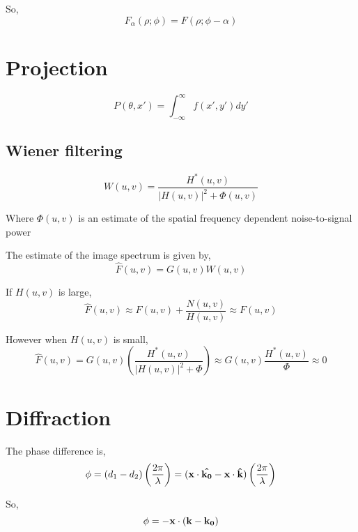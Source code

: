 \documentclass[12pt]{article}
\begin{document}
So,
\begin{equation}
    F_\alpha (\rho;\phi) = F(\rho;\phi-\alpha)
\end{equation}

\section{Projection}

\begin{equation}
    P(\theta,x') = \int_{-\infty}^\infty f(x',y')dy'
\end{equation}

\subsection{Wiener filtering}
\begin{equation}
    W(u,v) = \frac{H^*(u,v)}{ |H(u,v)|^2 + \Phi(u,v) }
\end{equation}

Where $\Phi(u,v)$ is an estimate of the spatial frequency dependent noise-to-signal power

The estimate of the image spectrum is given by,
\begin{equation}
    \hat{F}(u,v) = G(u,v)W(u,v)
\end{equation}

If $H(u,v)$ is large,
\begin{equation}
    \hat{F}(u,v) \approx F(u,v) + \frac{N(u,v)}{H(u,v)} \approx F(u,v)
\end{equation}

However when $H(u,v)$ is small,
\begin{equation}
    \hat{F}(u,v) = G(u,v)\left(\frac{H^*(u,v)}{ |H(u,v)|^2 + \Phi}\right) \approx G(u,v) \frac{H^*(u,v)}{\Phi} \approx 0
\end{equation}

\section{Diffraction}

The phase difference is,
\begin{equation}
    \phi = (d_1-d_2)\left(\frac{2\pi}{\lambda}\right) = (\vb{x} \cdot \vb{\hat{k_0}} - \vb{x} \cdot \vb{\hat{k}}) \left(\frac{2\pi}{\lambda}\right)
\end{equation}

So,
\begin{equation}
    \phi = -\vb{x} \cdot (\vb{k}-\vb{k_0})
\end{equation}
\end{document}
